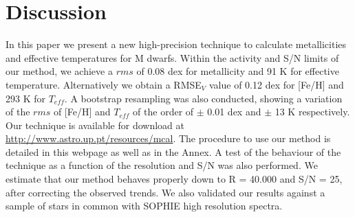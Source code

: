 \documentclass{aa}
\begin{document}






\section{Discussion}
\label{sec:discussion}

In this paper we present a new high-precision technique to calculate metallicities and effective temperatures for M dwarfs. Within the activity and S/N limits of our method, we achieve a $rms$ of 0.08 dex for metallicity and 91 K for effective temperature. Alternatively we obtain a RMSE$_{V}$ value of 0.12 dex for [Fe/H] and 293 K for $T_{eff}$. A bootstrap resampling was also conducted, showing a variation of the $rms$ of [Fe/H] and $T_{eff}$ of the order of $\pm$ 0.01 dex and $\pm$ 13 K respectively. Our technique is available for download at \url{http://www.astro.up.pt/resources/mcal}. The procedure to use our method is detailed in this webpage as well as in the Annex. A test of the behaviour of the technique as a function of the resolution and S/N was also performed. We estimate that our method behaves properly down to R = 40.000 and S/N = 25, after correcting the observed trends. We also validated our results against a sample of stars in common with SOPHIE high resolution spectra.

\end{document}
